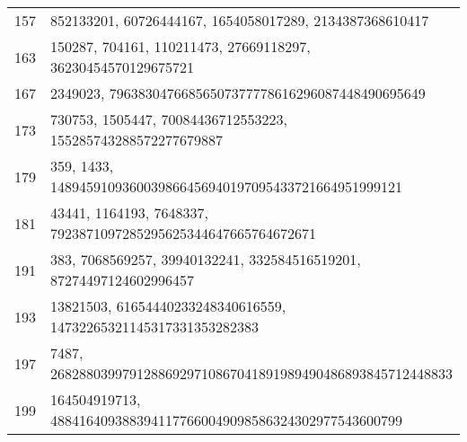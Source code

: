\documentclass[12pt]{article}
\begin{document}
\begin{tabular}{|r|l|}
157 & 852133201, 60726444167, 1654058017289, 2134387368610417 \\ 
163 & 150287, 704161, 110211473, 27669118297, 36230454570129675721 \\ 
167 & 2349023, 79638304766856507377778616296087448490695649 \\ 
173 & 730753, 1505447, 70084436712553223, 155285743288572277679887 \\ 
179 & 359, 1433, 1489459109360039866456940197095433721664951999121 \\ 
181 & 43441, 1164193, 7648337, 7923871097285295625344647665764672671 \\ 
191 & 383, 7068569257, 39940132241, 332584516519201, 87274497124602996457 \\ 
193 & 13821503, 61654440233248340616559, 14732265321145317331353282383 \\ 
197 & 7487, 26828803997912886929710867041891989490486893845712448833 \\ 
199 & 164504919713, 4884164093883941177660049098586324302977543600799 \\
\end{tabular}
\end{document}
